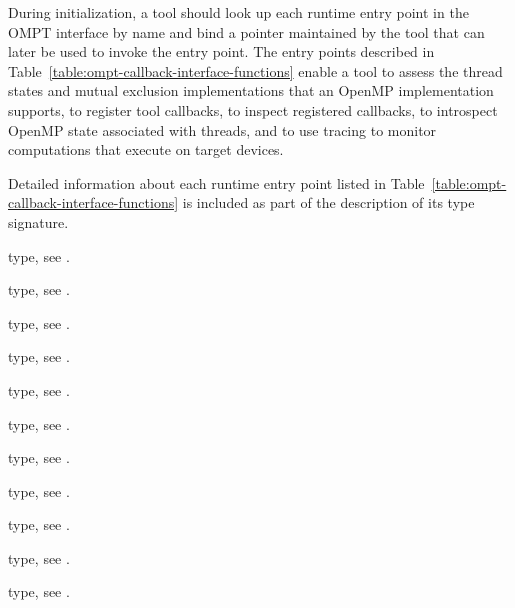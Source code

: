 During initialization, a tool should look up each runtime entry point in the
OMPT interface by name and bind a pointer maintained by the tool that can later
be used to invoke the entry point. The entry points described in 
Table~\ref{table:ompt-callback-interface-functions} enable a tool to assess
the thread states and mutual exclusion implementations that an OpenMP
implementation supports, to register tool callbacks, to inspect registered 
callbacks, to introspect OpenMP state associated with threads, and to use 
tracing to monitor computations that execute on target devices.

Detailed information about each runtime entry point listed in
Table~\ref{table:ompt-callback-interface-functions} is included as
part of the description of its type signature.

\begin{crossrefs}
\item {} type, 
see .

\item {} type, 
see  .

\item {} type, see .

\item {} type, see .

\item {} type, see .

\item {} type, see .

\item {} type, see .

\item {} type, 
see .

\item {} type, see .

\item {} type, 
see .

\item {} type, see .


\end{crossrefs}
